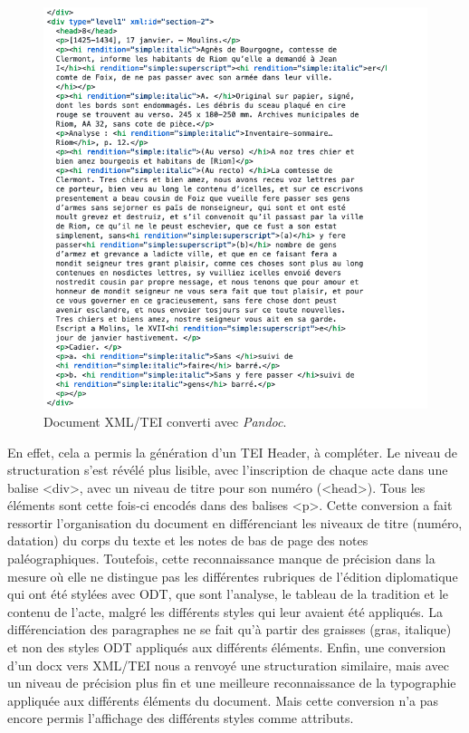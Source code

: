 \begin{figure}[H]
    \centering
    \includegraphics[scale=0.6]{img/pandoc_tei.png}
    \caption{Document XML/TEI converti avec \textit{Pandoc}.}
    \label{fig:pandoc_tei}
\end{figure}

\newpage 

\par En effet, cela a permis la génération d’un TEI Header, à compléter. Le niveau de structuration s’est révélé plus lisible, avec l’inscription de chaque acte dans une balise <div>, avec un niveau de titre pour son numéro (<head>). Tous les éléments sont cette fois-ci encodés dans des balises <p>. Cette conversion a fait ressortir l’organisation du document en différenciant les niveaux de titre (numéro, datation) du corps du texte et les notes de bas de page des notes paléographiques. Toutefois, cette reconnaissance manque de précision dans la mesure où elle ne distingue pas les différentes rubriques de l'édition diplomatique qui ont été stylées avec ODT, que sont l’analyse, le tableau de la tradition et le contenu de l’acte, malgré les différents styles qui leur avaient été appliqués. La différenciation des paragraphes ne se fait qu’à partir des graisses (gras, italique) et non des styles ODT appliqués aux différents éléments. Enfin, une conversion d’un docx vers XML/TEI nous a renvoyé une structuration similaire, mais avec un niveau de précision plus fin et une meilleure reconnaissance de la typographie appliquée aux différents éléments du document. Mais cette conversion n’a pas encore permis l’affichage des différents styles comme attributs. 
\newline 

